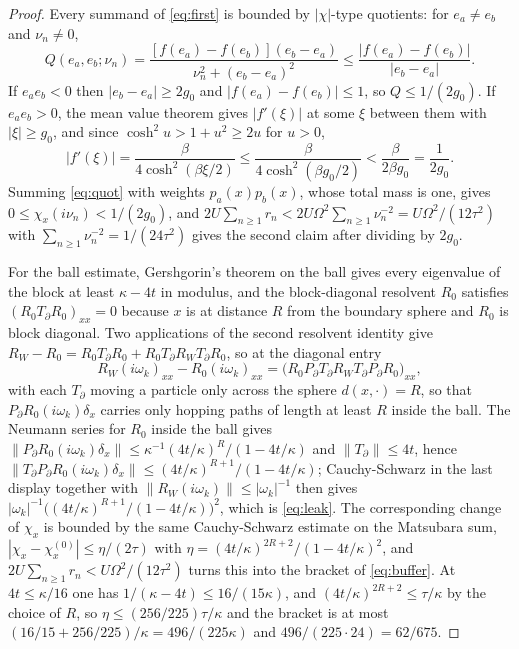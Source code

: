 \documentclass[11pt]{article}
\theoremstyle{definition}
\theoremstyle{remark}
\begin{document}
\begin{proof}
Every summand of \eqref{eq:first} is bounded by
$|\chi|$-type quotients: for $e_a\ne e_b$ and $\nu_n\ne0$,
\begin{equation}
Q(e_a,e_b;\nu_n)=\frac{[f(e_a)-f(e_b)](e_b-e_a)}{\nu_n^2+(e_b-e_a)^2}
\le\frac{|f(e_a)-f(e_b)|}{|e_b-e_a|}.
\label{eq:quot}
\end{equation}
If $e_ae_b<0$ then $|e_b-e_a|\ge2g_0$ and $|f(e_a)-f(e_b)|\le1$, so
$Q\le1/(2g_0)$. If $e_ae_b>0$, the mean value theorem gives $|f'(\xi)|$ at some
$\xi$ between them with $|\xi|\ge g_0$, and since
$\cosh^2u>1+u^2\ge2u$ for $u>0$,
\[
|f'(\xi)|=\frac{\beta}{4\cosh^2(\beta\xi/2)}
\le\frac{\beta}{4\cosh^2(\beta g_0/2)}<\frac{\beta}{2\beta g_0}=\frac{1}{2g_0}.
\]
Summing \eqref{eq:quot} with weights $p_a(x)p_b(x)$, whose total mass is one, gives
$0\le\chi_x(i\nu_n)<1/(2g_0)$, and
$2U\sum_{n\ge1}r_n<2U\Omega^2\sum_{n\ge1}\nu_n^{-2}=U\Omega^2/(12\tau^2)$ with
$\sum_{n\ge1}\nu_n^{-2}=1/(24\tau^2)$ gives the second claim after dividing by
$2g_0$.

For the ball estimate, Gershgorin's theorem on the ball gives every eigenvalue of the
block at least $\kappa-4t$ in modulus, and the block-diagonal resolvent $R_0$
satisfies $(R_0T_\partial R_0)_{xx}=0$ because $x$ is at distance $R$ from the
boundary sphere and $R_0$ is block diagonal. Two applications of the second resolvent
identity give $R_W-R_0=R_0T_\partial R_0+R_0T_\partial R_WT_\partial R_0$, so at the
diagonal entry
\[
R_W(i\omega_k)_{xx}-R_0(i\omega_k)_{xx}
=\bigl(R_0P_{\partial}T_\partial R_WT_\partial P_{\partial}R_0\bigr)_{xx},
\]
with each $T_\partial$ moving a particle only across the sphere $d(x,\cdot)=R$, so
that $P_{\partial}R_0(i\omega_k)\delta_x$ carries only hopping paths of length at
least $R$ inside the ball. The Neumann series for $R_0$ inside the ball gives
$\|P_\partial R_0(i\omega_k)\delta_x\|\le\kappa^{-1}(4t/\kappa)^R/(1-4t/\kappa)$
and $\|T_\partial\|\le4t$, hence
$\|T_\partial P_\partial R_0(i\omega_k)\delta_x\|\le(4t/\kappa)^{R+1}/(1-4t/\kappa)$;
Cauchy-Schwarz in the last display together with
$\|R_W(i\omega_k)\|\le|\omega_k|^{-1}$ then gives
$|\omega_k|^{-1}\bigl((4t/\kappa)^{R+1}/(1-4t/\kappa)\bigr)^2$, which is
\eqref{eq:leak}. The corresponding change of $\chi_x$ is bounded by the same
Cauchy-Schwarz estimate on the Matsubara sum,
$|\chi_x-\chi_x^{(0)}|\le\eta/(2\tau)$ with $\eta=(4t/\kappa)^{2R+2}/(1-4t/\kappa)^2$,
and $2U\sum_{n\ge1}r_n<U\Omega^2/(12\tau^2)$ turns this into the bracket of
\eqref{eq:buffer}. At $4t\le\kappa/16$ one has $1/(\kappa-4t)\le16/(15\kappa)$, and
$(4t/\kappa)^{2R+2}\le\tau/\kappa$ by the choice of $R$, so
$\eta\le(256/225)\tau/\kappa$ and the bracket is at most
$(16/15+256/225)/\kappa=496/(225\kappa)$ and
$496/(225\cdot24)=62/675$.
\end{proof}
\end{document}
